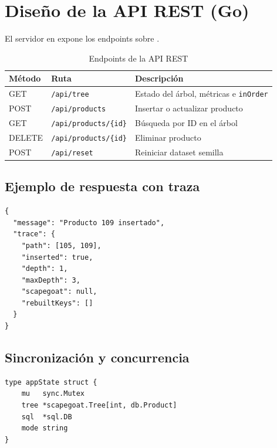 \chapter{Diseño de la API REST (Go)}

El servidor en  expone los endpoints sobre .

\begin{table}[H]
  \centering
  \caption{Endpoints de la API REST}
  \begin{tabular}{@{}llp{6.5cm}@{}}
    \toprule
    \textbf{Método} & \textbf{Ruta} & \textbf{Descripción} \\
    \midrule
    GET & \texttt{/api/tree} & Estado del árbol, métricas e \texttt{inOrder} \\
    POST & \texttt{/api/products} & Insertar o actualizar producto \\
    GET & \texttt{/api/products/\{id\}} & Búsqueda por ID en el árbol \\
    DELETE & \texttt{/api/products/\{id\}} & Eliminar producto \\
    POST & \texttt{/api/reset} & Reiniciar dataset semilla \\
    \bottomrule
  \end{tabular}
\end{table}

\section{Ejemplo de respuesta con traza}

\begin{lstlisting}[style=jsoncode,caption={Fragmento de respuesta POST /api/products}]
{
  "message": "Producto 109 insertado",
  "trace": {
    "path": [105, 109],
    "inserted": true,
    "depth": 1,
    "maxDepth": 3,
    "scapegoat": null,
    "rebuiltKeys": []
  }
}
\end{lstlisting}

\section{Sincronización y concurrencia}

\begin{lstlisting}[style=gocode,caption={Estado compartido protegido con mutex}]
type appState struct {
    mu   sync.Mutex
    tree *scapegoat.Tree[int, db.Product]
    sql  *sql.DB
    mode string
}
\end{lstlisting}


